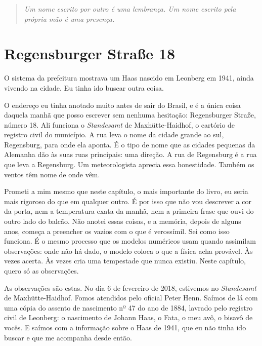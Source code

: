 \documentclass[
  brazilian,
  11pt,
  openany]{book}
\begin{document}
\begin{quote}
\emph{Um nome escrito por outro é uma lembrança. Um nome escrito pela
própria mão é uma presença.}
\end{quote}

\section{Regensburger Straße 18}\label{regensburger-strauxdfe-18}

O sistema da prefeitura mostrava um Haas nascido em Leonberg em 1941,
ainda vivendo na cidade. Eu tinha ido buscar outra coisa.

O endereço eu tinha anotado muito antes de sair do Brasil, e é a única
coisa daquela manhã que posso escrever sem nenhuma hesitação:
Regensburger Straße, número 18. Ali funciona o \emph{Standesamt} de
Maxhütte-Haidhof, o cartório de registro civil do município. A rua leva
o nome da cidade grande ao sul, Regensburg, para onde ela aponta. É o
tipo de nome que as cidades pequenas da Alemanha dão às suas ruas
principais: uma direção. A rua de Regensburg é a rua que leva a
Regensburg. Um meteorologista aprecia essa honestidade. Também os ventos
têm nome de onde vêm.

Prometi a mim mesmo que neste capítulo, o mais importante do livro, eu
seria mais rigoroso do que em qualquer outro. É por isso que não vou
descrever a cor da porta, nem a temperatura exata da manhã, nem a
primeira frase que ouvi do outro lado do balcão. Não anotei essas
coisas, e a memória, depois de alguns anos, começa a preencher os vazios
com o que é verossímil. Sei como isso funciona. É o mesmo processo que
os modelos numéricos usam quando assimilam observações: onde não há
dado, o modelo coloca o que a física acha provável. Às vezes acerta. Às
vezes cria uma tempestade que nunca existiu. Neste capítulo, quero só as
observações.

As observações são estas. No dia 6 de fevereiro de 2018, estivemos no
\emph{Standesamt} de Maxhütte-Haidhof. Fomos atendidos pelo oficial
Peter Henn. Saímos de lá com uma cópia do assento de nascimento nº 47 do
ano de 1884, lavrado pelo registro civil de Leonberg: o nascimento de
Johann Haas, o Fata, o meu avô, o bisavô de vocês. E saímos com a
informação sobre o Haas de 1941, que eu não tinha ido buscar e que me
acompanha desde então.
\end{document}
